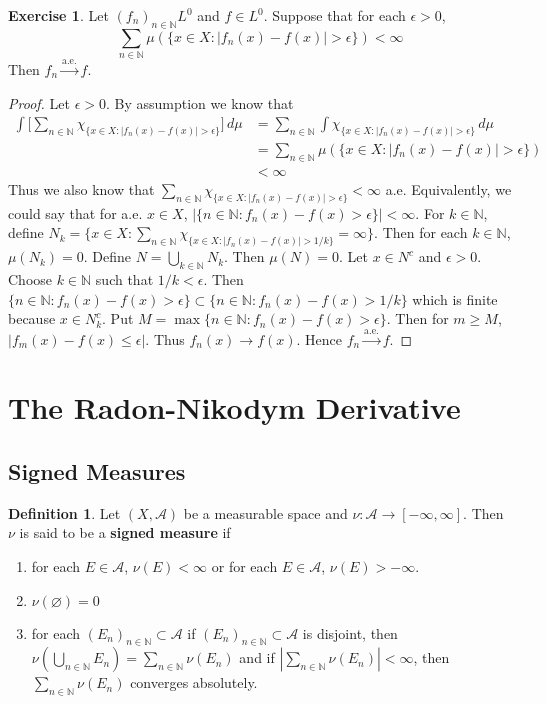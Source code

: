 \documentclass[12pt]{amsart}
\theoremstyle{definition}
\newtheorem{defn}[definition]{Definition}
\newtheorem{ex}[definition]{Exercise}
\newcommand{\ep}{\epsilon}
\newcommand{\N}{\mathbb{N}}
\newcommand{\MA}{\mathcal{A}}
\newcommand{\dmu}{\, d \mu}
\newcommand{\convt}[1]{\xrightarrow{\text{#1}}}
\newcommand{\lex}[1]{\label{ex:#1}}
\newcommand{\ld}[1]{\label{defn:#1}}
\begin{document}
	
	\begin{ex} \lex{35015} 
		Let $(f_n)_{n \in \N} L^0$ and $f \in L^0$. Suppose that for each $\ep >0$, $$\sum_{n \in \N}\mu(\{x \in X: |f_n(x)-f(x)| > \ep\}) < \infty$$
		Then $f_n \convt{a.e.} f$.
	\end{ex}
	
	\begin{proof}
		Let $\ep>0$. By assumption we know that
		\begin{align*}
			\int \bigg[ \sum_{n \in \N}\chi_{\{x \in X: |f_n(x)-f(x)| > \ep\}}\bigg] \dmu 
			&= \sum_{n \in \N}\int \chi_{\{x \in X: |f_n(x)-f(x)| > \ep\}}\dmu\\
			&=\sum_{n \in \N}\mu(\{x \in X: |f_n(x)-f(x)| > \ep\})\\
			& < \infty
		\end{align*}
		Thus we also know that $\sum_{n \in \N}\chi_{\{x \in X: |f_n(x)-f(x)| > \ep\}} < \infty$ a.e. Equivalently, we could say that for a.e. $x \in X$, $|\{n \in \N: f_n(x) - f(x) > \ep\}| < \infty$. For $k \in \N$, define $N_k = \{x \in X: \sum_{n \in \N}\chi_{\{x \in X: |f_n(x)-f(x)| > 1/k\}} = \infty\}$. Then for each $k \in \N$, $\mu(N_k) = 0$. Define $N = \bigcup_{k \in \N} N_k$. Then $\mu(N) = 0$. Let $x \in N^c$ and $\ep > 0$. Choose $k \in \N$ such that $1/k < \ep$. Then $\{n \in \N: f_n(x) - f(x) > \ep\} \subset \{n \in \N: f_n(x) - f(x) > 1/k\}$ which is finite because $x \in N_k^c$. Put $M = \max\{n \in \N: f_n(x) - f(x) > \ep\}$. Then for $m \geq M$, $|f_m(x) - f(x) \leq \ep|$. Thus $f_n(x) \rightarrow f(x)$. Hence $f_n \convt{a.e.} f$.
	\end{proof}
	
	
	
	
	
	
	
	
	
	
	
	
	
	\newpage
	\section{The Radon-Nikodym Derivative}
	
	\subsection{Signed Measures}
	
	\begin{defn} \ld{41001} 
		Let $(X, \MA)$ be a measurable space and $\nu : \MA \rightarrow [-\infty, \infty]$. Then $\nu$ is said to be a \textbf{signed measure} if 
		\begin{enumerate}
			\item for each $E \in \MA$, $\nu(E) < \infty$ or for each $E \in \MA$, $\nu(E) > -\infty$.
			\item $\nu(\varnothing) = 0$
			\item for each $(E_n)_{n \in \N} \subset \MA$ if $(E_n)_{n \in \N} \subset \MA$ is disjoint, then $\nu(\bigcup\limits_{n \in \N} E_n) = \sum\limits_{n \in \N} \nu(E_n)$ and if $|\sum\limits_{n \in \N} \nu(E_n)| < \infty$, then $\sum\limits_{n \in \N} \nu(E_n)$ converges absolutely.
		\end{enumerate}
	\end{defn}
	
\end{document}
